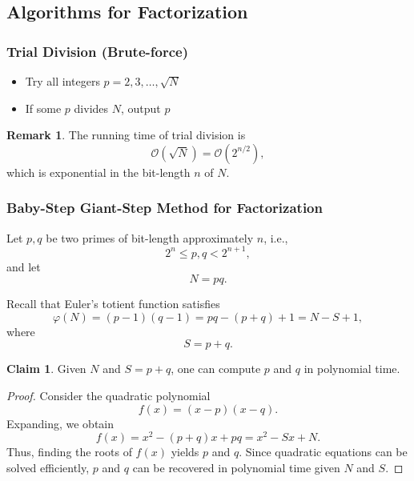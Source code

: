 \documentclass[11pt]{article}
\theoremstyle{definition}
\newtheorem{claim}{Claim}[section]
\newtheorem{remark}{Remark}[section]
\theoremstyle{proof}
\begin{document}
	\subsection{Algorithms for Factorization}
	
	\subsubsection{Trial Division (Brute-force)}
	
	\begin{itemize}
		\item Try all integers $p = 2,3,\dots, \sqrt{N}$
		\item If some $p$ divides $N$, output $p$
	\end{itemize}
	
	\begin{remark}
		The running time of trial division is
		$$
		\mathcal{O}(\sqrt{N}) = \mathcal{O}(2^{n/2}),
		$$
		which is exponential in the bit-length $n$ of $N$.
	\end{remark}
	
	\subsubsection{Baby-Step Giant-Step Method for Factorization}
	
	Let $p,q$ be two primes of bit-length approximately $n$, i.e.,
	$$
	2^{n} \leq p,q < 2^{n+1},
	$$
	and let
	$$
	N = pq.
	$$
	
	Recall that Euler's totient function satisfies
	$$
	\varphi(N) = (p-1)(q-1) = pq - (p+q) + 1 = N - S + 1,
	$$
	where
	$$
	S = p + q.
	$$
	
	\begin{claim}
		Given $N$ and $S = p+q$, one can compute $p$ and $q$ in polynomial time.
	\end{claim}
	
	\begin{proof}
		Consider the quadratic polynomial
		$$
		f(x) = (x - p)(x - q).
		$$
		Expanding, we obtain
		$$
		f(x) = x^2 - (p+q)x + pq = x^2 - Sx + N.
		$$
		Thus, finding the roots of $f(x)$ yields $p$ and $q$.
		Since quadratic equations can be solved efficiently,
		$p$ and $q$ can be recovered in polynomial time given $N$ and $S$.
	\end{proof}
	
\end{document}
